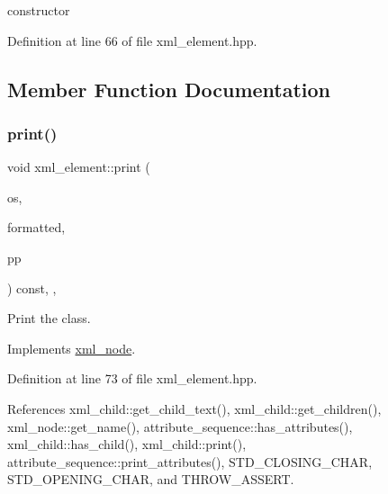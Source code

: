 constructor 



Definition at line 66 of file xml\+\_\+element.\+hpp.



\subsection{Member Function Documentation}
\mbox{\label{classxml__element_ac2a5c89bcbbfee04039fe93824489677}} 
\subsubsection{\texorpdfstring{print()}{print()}}
{\footnotesize\ttfamily void xml\+\_\+element\+::print (\begin{DoxyParamCaption}\item[{std\+::ostream \&}]{os,  }\item[{bool}]{formatted,  }\item[{\hyperlink{classsimple__indent}{simple\+\_\+indent} $\ast$}]{pp }\end{DoxyParamCaption}) const\hspace{0.3cm}{\ttfamily [inline]}, {\ttfamily [override]}, {\ttfamily [virtual]}}



Print the class. 



Implements \hyperlink{classxml__node_a150e224e18301e5842d10a5e47cc2661}{xml\+\_\+node}.



Definition at line 73 of file xml\+\_\+element.\+hpp.



References xml\+\_\+child\+::get\+\_\+child\+\_\+text(), xml\+\_\+child\+::get\+\_\+children(), xml\+\_\+node\+::get\+\_\+name(), attribute\+\_\+sequence\+::has\+\_\+attributes(), xml\+\_\+child\+::has\+\_\+child(), xml\+\_\+child\+::print(), attribute\+\_\+sequence\+::print\+\_\+attributes(), S\+T\+D\+\_\+\+C\+L\+O\+S\+I\+N\+G\+\_\+\+C\+H\+AR, S\+T\+D\+\_\+\+O\+P\+E\+N\+I\+N\+G\+\_\+\+C\+H\+AR, and T\+H\+R\+O\+W\+\_\+\+A\+S\+S\+E\+RT.

